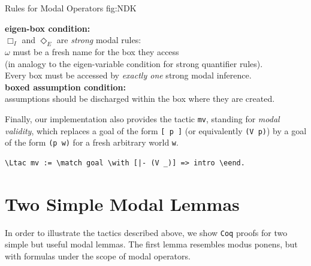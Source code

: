 \documentclass{llncs}
\newcommand{\nec}{\Box} %
\newcommand{\pos}{\Diamond} %
\newcommand{\red}[1]{\textcolor[rgb]{1,0,0}{#1}}
\newcommand{\blue}[1]{\textcolor[rgb]{0,0,1}{#1}}
\newcommand{\Ltac}{\red{Ltac}}
\newcommand{\match}{\blue{match}}
\newcommand{\with}{\blue{with}}
\newcommand{\eend}{\blue{end}}
\newcommand{\Coq}{\texttt{Coq}\xspace}
\begin{document}
\begin{calculus}
{Rules for Modal Operators}
{fig:NDK}

\vspace{1em}

\s\s
\infer[\nec_I]{\nec A}{\omega: \fbox{\infer*{A}{}} }
\s
\infer[\nec_E]{w: \fbox{ \infer*{}{A} } }{\nec A}
\s
\infer[\pos_I]{\pos A}{w: \fbox{\infer*{A}{}} }
\s
\infer[\pos_E]{\omega: \fbox{ \infer*{}{A} } }{\pos A}


\vspace{1em}

\begin{center}
\textbf{eigen-box condition:}\\ 
$\nec_I$ and $\pos_E$ are \emph{strong} modal rules: \\
$\omega$ must be a fresh name for the box they access \\ 
(in analogy to the eigen-variable condition for strong quantifier rules). \\
Every box must be accessed by \emph{exactly one} strong modal inference. \\
\vspace{0.5em}
\textbf{boxed assumption condition:} \\
assumptions should be discharged within the box where they are created.
\end{center}

\vspace{1em}
\end{calculus}

\noindent
Finally, our implementation also provides the tactic \texttt{mv},
standing for \emph{modal validity}, which replaces a goal of the form
\texttt{[ p ]} (or equivalently \texttt{(V p)}) by a goal of the form
\texttt{(p w)} for a fresh arbitrary world \texttt{w}.

\begin{Verbatim}[commandchars=\\\{\},fontsize=\verbsize]
\Ltac mv := \match goal \with [|- (V _)] => intro \eend.
\end{Verbatim}



\section{Two Simple Modal Lemmas}
\label{sec:SimpleExamples}

In order to illustrate the tactics described above, 
we show \Coq proofs for two simple but useful modal lemmas. 
The first lemma resembles modus ponens, but with formulas 
under the scope of modal operators. 
\end{document}
